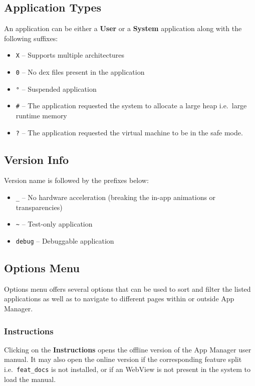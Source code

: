 \subsection{Application Types}\label{subsec:main-page-application-types} %
An application can be either a \textbf{User} or a \textbf{System} application along with the following suffixes:
\begin{itemize}
    \item \texttt{X} -- Supports multiple architectures
    \item \texttt{0} -- No dex files present in the application
    \item \texttt{°} -- Suspended application
    \item \texttt{\#} -- The application requested the system to allocate a large heap i.e.\ large runtime memory
    \item \texttt{?} -- The application requested the virtual machine to be in the safe mode.
\end{itemize}

\subsection{Version Info}\label{subsec:main-page-version-info} %
Version name is followed by the prefixes below:
\begin{itemize}
    \item \texttt{\_} -- No hardware acceleration (breaking the in-app animations or transparencies)
    \item \texttt{\textasciitilde} -- Test-only application
    \item \texttt{debug} -- Debuggable application
\end{itemize}

\subsection{Options Menu}\label{subsec:main-page-options-menu} %
Options menu offers several options that can be used to sort and filter the listed applications as well as to navigate
to different pages within or outside App Manager.

\subsubsection{Instructions} %
Clicking on the \textbf{Instructions} opens the offline version of the App Manager user manual. It may also open the
online version if the corresponding feature split i.e.\ \texttt{feat\_docs} is not installed, or if an WebView is not
present in the system to load the manual.

